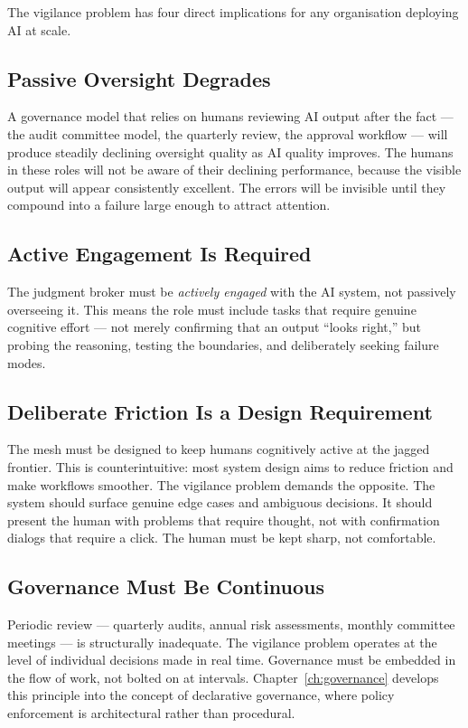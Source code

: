 The vigilance problem has four direct implications for any organisation deploying AI at scale.

\subsection{Passive Oversight Degrades}

A governance model that relies on humans reviewing AI output after the fact --- the audit committee model, the quarterly review, the approval workflow --- will produce steadily declining oversight quality as AI quality improves. The humans in these roles will not be aware of their declining performance, because the visible output will appear consistently excellent. The errors will be invisible until they compound into a failure large enough to attract attention.

\subsection{Active Engagement Is Required}

The judgment broker must be \emph{actively engaged} with the AI system, not passively overseeing it. This means the role must include tasks that require genuine cognitive effort --- not merely confirming that an output ``looks right,'' but probing the reasoning, testing the boundaries, and deliberately seeking failure modes.

\subsection{Deliberate Friction Is a Design Requirement}

The mesh must be designed to keep humans cognitively active at the jagged frontier. This is counterintuitive: most system design aims to reduce friction and make workflows smoother. The vigilance problem demands the opposite. The system should surface genuine edge cases and ambiguous decisions. It should present the human with problems that require thought, not with confirmation dialogs that require a click. The human must be kept sharp, not comfortable.

\subsection{Governance Must Be Continuous}

Periodic review --- quarterly audits, annual risk assessments, monthly committee meetings --- is structurally inadequate. The vigilance problem operates at the level of individual decisions made in real time. Governance must be embedded in the flow of work, not bolted on at intervals. Chapter~\ref{ch:governance} develops this principle into the concept of declarative governance, where policy enforcement is architectural rather than procedural.

